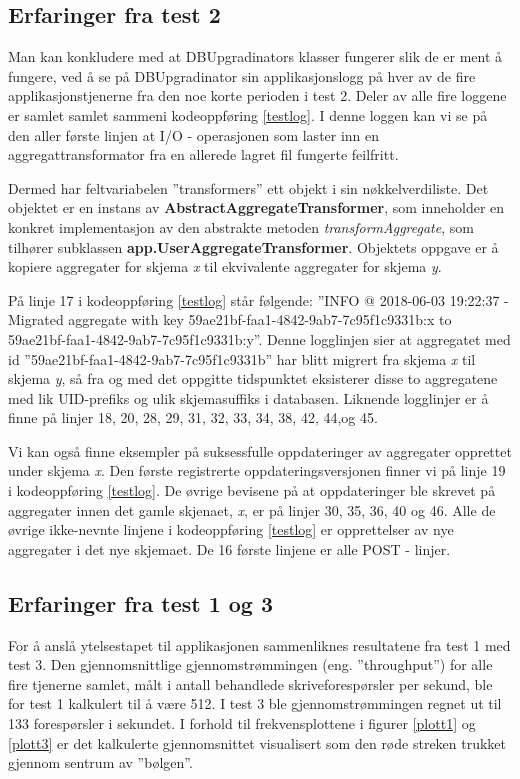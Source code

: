 \subsection{Erfaringer fra test 2}

Man kan konkludere med at DBUpgradinators klasser fungerer slik de er ment å fungere, ved å se på DBUpgradinator sin applikasjonslogg på hver av de fire applikasjonstjenerne fra den noe korte perioden i test 2. Deler av alle fire loggene er samlet samlet sammeni kodeoppføring \ref{testlog}. I denne loggen kan vi se på den aller første linjen at I/O - operasjonen som laster inn en aggregattransformator fra en allerede lagret fil fungerte feilfritt.

Dermed har feltvariabelen ''transformers'' ett objekt i sin nøkkelverdi\-liste. Det objektet er en instans av \textbf{AbstractAggregateTransformer}, som inneholder en konkret implementasjon av den abstrakte metoden \emph{transformAggregate}, som tilhører subklassen \textbf{app.}\textbf{\-UserAggregateTransformer}. Objektets oppgave er å kopiere aggregater for skjema \emph{x} til ekvivalente aggregater for skjema \emph{y}.

På linje 17 i kodeoppføring \ref{testlog} står følgende: ''INFO @ 2018-06-03 19:22:37 - Migrated aggregate with key 59ae21bf-faa1-4842-9ab7-7c95f1c9331b:x to 59ae21bf-faa1-4842-9ab7-7c95f1c9331b:y''. Denne logglinjen sier at aggregatet med id ''59ae21bf-faa1-4842-9ab7-7c95f1c9331b'' har blitt migrert fra skjema \emph{x} til skjema \emph{y}, så fra og med det oppgitte tidspunktet eksisterer disse to aggregatene med lik UID-prefiks og ulik skjemasuffiks i databasen. Liknende logglinjer er å finne på linjer 18, 20, 28, 29, 31, 32, 33, 34, 38, 42, 44,og 45.

Vi kan også finne eksempler på suksessfulle oppdateringer av aggregater opprettet under skjema \emph{x}. Den første registrerte oppdateringsversjonen finner vi på linje 19 i kodeoppføring \ref{testlog}. De øvrige bevisene på at oppdateringer ble skrevet på aggregater innen det gamle skjenaet, \emph{x}, er på linjer 30, 35, 36, 40 og 46. Alle de øvrige ikke-nevnte linjene i kodeoppføring \ref{testlog} er opprettelser av nye aggregater i det nye skjemaet. De 16 første linjene er alle POST - linjer.

\subsection{Erfaringer fra test 1 og 3} \label{diseone}

For å anslå ytelsestapet til applikasjonen sammenliknes resultatene fra test 1 med test 3. Den gjennomsnittlige gjennomstrømmingen (eng. ''throughput'') for alle fire tjenerne samlet, målt i antall behandlede skriveforespørsler per sekund, ble for test 1 kalkulert til å være 512. I test 3 ble gjennomstrømmingen regnet ut til 133 forespørsler i sekundet. I forhold til frekvensplottene i figurer \ref{plott1} og \ref{plott3} er det kalkulerte gjennomsnittet visualisert som den røde streken trukket gjennom sentrum av ''bølgen''.

